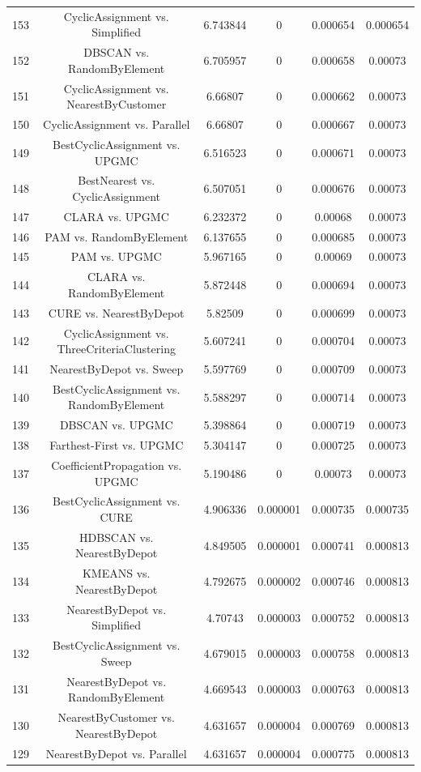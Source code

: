 \documentclass[a4paper,10pt]{article}
\begin{document}
\begin{landscape}
\begin{table}[!htp]
\begin{tabular}{cccccc}
153&CyclicAssignment vs. Simplified&6.743844&0&0.000654&0.000654\\
152&DBSCAN vs. RandomByElement&6.705957&0&0.000658&0.00073\\
151&CyclicAssignment vs. NearestByCustomer&6.66807&0&0.000662&0.00073\\
150&CyclicAssignment vs. Parallel&6.66807&0&0.000667&0.00073\\
149&BestCyclicAssignment vs. UPGMC&6.516523&0&0.000671&0.00073\\
148&BestNearest vs. CyclicAssignment&6.507051&0&0.000676&0.00073\\
147&CLARA vs. UPGMC&6.232372&0&0.00068&0.00073\\
146&PAM vs. RandomByElement&6.137655&0&0.000685&0.00073\\
145&PAM vs. UPGMC&5.967165&0&0.00069&0.00073\\
144&CLARA vs. RandomByElement&5.872448&0&0.000694&0.00073\\
143&CURE vs. NearestByDepot&5.82509&0&0.000699&0.00073\\
142&CyclicAssignment vs. ThreeCriteriaClustering&5.607241&0&0.000704&0.00073\\
141&NearestByDepot vs. Sweep&5.597769&0&0.000709&0.00073\\
140&BestCyclicAssignment vs. RandomByElement&5.588297&0&0.000714&0.00073\\
139&DBSCAN vs. UPGMC&5.398864&0&0.000719&0.00073\\
138&Farthest-First vs. UPGMC&5.304147&0&0.000725&0.00073\\
137&CoefficientPropagation vs. UPGMC&5.190486&0&0.00073&0.00073\\
136&BestCyclicAssignment vs. CURE&4.906336&0.000001&0.000735&0.000735\\
135&HDBSCAN vs. NearestByDepot&4.849505&0.000001&0.000741&0.000813\\
134&KMEANS vs. NearestByDepot&4.792675&0.000002&0.000746&0.000813\\
133&NearestByDepot vs. Simplified&4.70743&0.000003&0.000752&0.000813\\
132&BestCyclicAssignment vs. Sweep&4.679015&0.000003&0.000758&0.000813\\
131&NearestByDepot vs. RandomByElement&4.669543&0.000003&0.000763&0.000813\\
130&NearestByCustomer vs. NearestByDepot&4.631657&0.000004&0.000769&0.000813\\
129&NearestByDepot vs. Parallel&4.631657&0.000004&0.000775&0.000813\\

\end{tabular}
\end{table}
\end{landscape}
\end{document}
